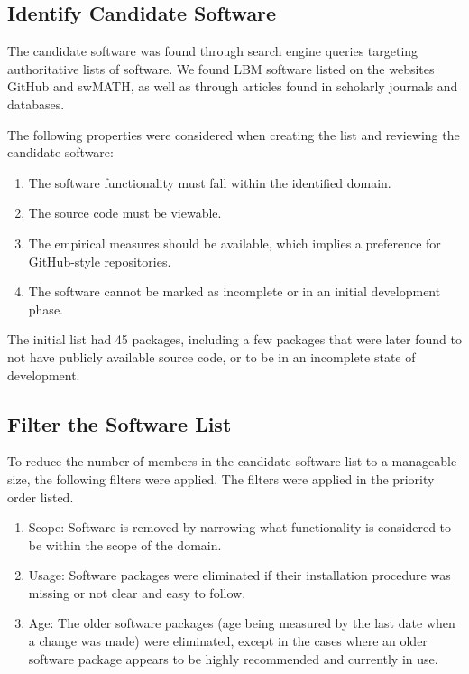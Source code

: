 \documentclass[12pt, notitlepage]{article}
\begin{document}
\subsection{Identify Candidate Software}\label{identifysoftware}

The candidate software was found through search engine queries targeting authoritative lists of software. We found LBM software listed on the websites GitHub and swMATH, as well as through articles found in scholarly journals and databases. 

The following properties were considered when creating the list and reviewing the candidate software:

\begin{enumerate}
	\item The software functionality must fall within the identified domain.
	\item The source code must be viewable.
	\item The empirical measures should be available, which implies a preference for GitHub-style repositories.
	\item The software cannot be marked as incomplete or in an initial development phase.
\end{enumerate}

The initial list had 45 packages, including a few packages that were later found to not have publicly available source code, or to be in an incomplete state of development. 

\subsection{Filter the Software List}\label{filtersoftware}

To reduce the number of members in the candidate software list to a manageable size, the following filters were applied. The filters were applied in the priority order listed.

\begin{enumerate}
	\item Scope: Software is removed by narrowing what functionality is considered to be within the scope of the domain.
	\item Usage: Software packages were eliminated if their installation procedure was missing or not clear and easy to follow.
	\item Age: The older software packages (age being measured by the last date when a change was made) were eliminated, except in the cases where an older software package appears to be highly recommended and currently in use. 
\end{enumerate}
\end{document}
